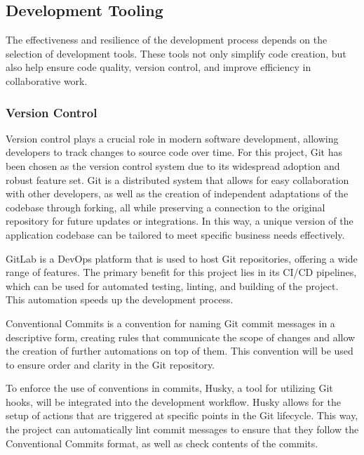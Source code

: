 \subsection{Development Tooling}

The effectiveness and resilience of the development process depends on the selection of development tools. These tools not only simplify code creation, but also help ensure code quality, version control, and improve efficiency in collaborative work.

\subsubsection{Version Control}

Version control plays a crucial role in modern software development, allowing developers to track changes to source code over time. For this project, Git has been chosen as the version control system due to its widespread adoption and robust feature set. Git is a distributed system that allows for easy collaboration with other developers, as well as the creation of independent adaptations of the codebase through forking, all while preserving a connection to the original repository for future updates or integrations. In this way, a unique version of the application codebase can be tailored to meet specific business needs effectively.  \cite{Ponuthorai2022}

GitLab is a DevOps platform that is used to host Git repositories, offering a wide range of features. The primary benefit for this project lies in its CI/CD pipelines, which can be used for automated testing, linting, and building of the project. This automation speeds up the development process. \cite{GitLab}

Conventional Commits is a convention for naming Git commit messages in a descriptive form, creating rules that communicate the scope of changes and allow the creation of further automations on top of them. This convention will be used to ensure order and clarity in the Git repository. \cite{ConventionalCommits}

To enforce the use of conventions in commits, Husky, a tool for utilizing Git hooks, will be integrated into the development workflow. Husky allows for the setup of actions that are triggered at specific points in the Git lifecycle. This way, the project can automatically lint commit messages to ensure that they follow the Conventional Commits format, as well as check contents of the commits. \cite{Husky}


